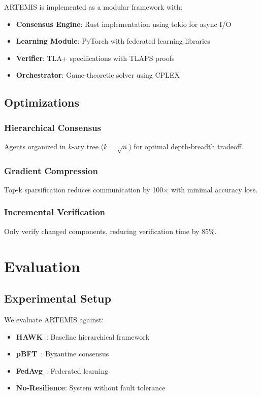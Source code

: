 \documentclass[conference]{IEEEtran}
\begin{document}
ARTEMIS is implemented as a modular framework with:
\begin{itemize}
    \item \textbf{Consensus Engine}: Rust implementation using tokio for async I/O
    \item \textbf{Learning Module}: PyTorch with federated learning libraries
    \item \textbf{Verifier}: TLA+ specifications with TLAPS proofs
    \item \textbf{Orchestrator}: Game-theoretic solver using CPLEX
\end{itemize}

\subsection{Optimizations}

\subsubsection{Hierarchical Consensus}
Agents organized in $k$-ary tree ($k = \sqrt{n}$) for optimal depth-breadth tradeoff.

\subsubsection{Gradient Compression}
Top-k sparsification reduces communication by 100× with minimal accuracy loss.

\subsubsection{Incremental Verification}
Only verify changed components, reducing verification time by 85\%.

\section{Evaluation}

\subsection{Experimental Setup}

We evaluate ARTEMIS against:
\begin{itemize}
    \item \textbf{HAWK}~\cite{hawk2025}: Baseline hierarchical framework
    \item \textbf{pBFT}~\cite{castro1999practical}: Byzantine consensus
    \item \textbf{FedAvg}~\cite{mcmahan2017federated}: Federated learning
    \item \textbf{No-Resilience}: System without fault tolerance
\end{itemize}
\end{document}
